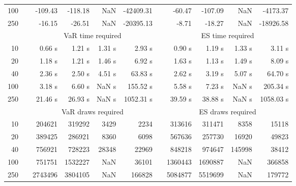 {{\begin{longtable}{rr rrrr r rrrr}
100 && -109.43 & -118.18 &  NaN & -42409.31 && -60.47 & -107.09 &  NaN & -4173.37 \\ 
250 && -16.15 & -26.51 &  NaN & -20395.13 && -8.71 & -18.27 &  NaN & -18926.58 \\ 
\hline 
 & & \multicolumn{4}{c}{VaR time required} && \multicolumn{4}{c}{ES time required} \\ \cline{3-6}  \cline{8-11}
10 & & 0.66 s & 1.21 s & 1.31 s & 2.93 s && 0.90 s & 1.19 s & 1.33 s & 3.11 s \\ 
20 & & 1.18 s & 1.21 s & 1.46 s & 6.92 s && 1.63 s & 1.13 s & 1.49 s & 8.09 s \\ 
40 & & 2.36 s & 2.50 s & 4.51 s & 63.83 s && 2.62 s & 3.19 s & 5.07 s & 64.70 s \\ 
100 & & 3.18 s & 6.60 s &  NaN s & 155.52 s && 5.58 s & 7.23 s &  NaN s & 205.34 s \\ 
250 & & 21.46 s & 26.93 s &  NaN s & 1052.31 s && 39.59 s & 38.88 s &  NaN s & 1058.03 s \\ 
\hline 
 && \multicolumn{4}{c}{VaR draws required} &&   \multicolumn{4}{c}{ES draws required} \\  \cline{3-6}  \cline{8-11} 
10 & & 204621 & 319292 & 3429 & 2234 && 313616 & 311471 & 8358  & 15118 \\ 
20 & & 389425 & 286921 & 8360 & 6098 && 567636 & 257730 & 16920  & 49823 \\ 
40 & & 756921 & 728223 & 28348 & 22969 && 848218 & 974647 & 145998  & 38412 \\ 
100 & & 751751 & 1532227 & NaN & 36101 && 1360443 & 1690887 & NaN  & 366858 \\ 
250 & & 2743496 & 3804105 & NaN & 166828 && 5084877 & 5519699 & NaN  & 179772 \\ 
\hline 
\end{longtable} 
} 
} 
